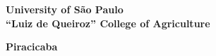 
\thispagestyle{empty}


\begin{center}
  { \fontsize{14}{14} \sffamily \bfseries
    University of S\~{a}o Paulo\\
    ``Luiz de Queiroz'' College of Agriculture\\
    \CENA
  }
\end{center}


\vfill %

\vspace{10pt}
\begin{center}
  \begin{center}
    { \fontsize{14}{14} \sffamily \bfseries
      \TituloEmIngles
    }
  \end{center}

  \vspace{60pt}
  \begin{center}
    { \fontsize{14}{14} \sffamily \bfseries
      \Autor
    }
  \end{center}


  \vspace{20pt}
  \begin{flushright}
    \begin{minipage}{0.5\textwidth}
      { \fontsize{10}{10} \sffamily
        \TituloObtido
      }
    \end{minipage}
  \end{flushright}

  \vfill

  \begin{center}
    { \fontsize{14}{14} \sffamily \bfseries
      Piracicaba\\
      \AnoDeposito
    }
  \end{center}

\end{center}

\newpage
\thispagestyle{empty}
\phantom{ôlas}


\cleardoublepage
{}  %
\thispagestyle{empty} %

